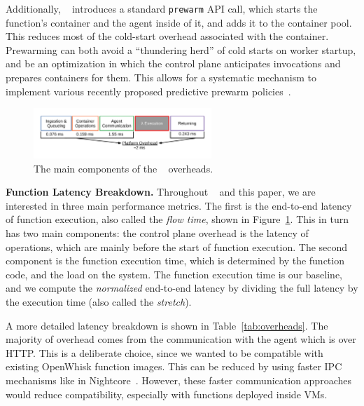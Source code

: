 Additionally, \sysname~ introduces a standard \texttt{prewarm}  API call, which starts the function's container and the agent inside of it, and adds it to the container pool.
This reduces most of the cold-start overhead associated with the container.
Prewarming can both avoid a ``thundering herd'' of cold starts on worker startup, and be an optimization in which the control plane anticipates invocations and prepares containers for them. 
This allows for a systematic mechanism to implement various recently proposed predictive prewarm policies~\cite{roy2022icebreaker, shahrad_serverless_2020, silva_prebaking_2020}. 





\begin{figure}
\centering 
\includegraphics[width=0.6\textwidth]{iluvatar/figs/OverheadTimeline.pdf}
\caption{The main components of the \sysname~ overheads.}
\label{fig:timeline-flow}
\end{figure}


\noindent \textbf{Function Latency Breakdown.}
Throughout \sysname~ and this paper, we are interested in three main performance metrics. 
The first is the end-to-end latency of function execution, also called the \emph{flow time}, shown in Figure~\ref{fig:timeline-flow}.
This in turn has two main components: the control plane overhead is the latency of \sysname~ operations, which are mainly before the start of function execution.
The second component is the function execution time, which is determined by the function code, and the load on the system.
The function execution time is our baseline, and we compute the \emph{normalized} end-to-end latency by dividing the full latency by the execution time (also called the \emph{stretch}). 

A more detailed latency breakdown is shown in Table~\ref{tab:overheads}.
The majority of overhead comes from the communication with the agent which is over HTTP. 
This is a deliberate choice, since we wanted to be compatible with existing OpenWhisk function images.
This can be reduced by using faster IPC mechanisms like in Nightcore~\cite{jia2021nightcore}. 
However, these faster communication approaches would reduce compatibility, especially with functions deployed inside VMs.

